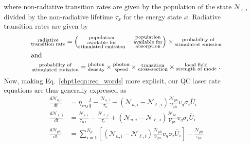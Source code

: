 \documentclass[12pt]{report}
\begin{document}
where non-radiative transition rates are given by the population of the state $\mathcal{N}_{x,i}$ divided by the non-radiative lifetime $\tau_x$ for the energy state $x$.  Radiative transition rates are given by
\begin{gather*}
\begin{subarray}{c}\textnormal{radiative}\\\textnormal{transition rate}\end{subarray} =
\left( \begin{subarray}{c}\textnormal{population}\\\textnormal{available for}\\\textnormal{stimulated emission}\end{subarray} - \begin{subarray}{c}\textnormal{population}\\\textnormal{available for}\\\textnormal{absorption}\end{subarray}\right) \times \begin{subarray}{c}\textnormal{probability of}\\\textnormal{stimulated emission}\end{subarray}\\
\intertext{and}
\begin{subarray}{c}\textnormal{probability of}\\\textnormal{stimulated emission}\end{subarray} = \begin{subarray}{c}\textnormal{photon}\\\textnormal{density}\end{subarray} \times \begin{subarray}{c}\textnormal{photon}\\\textnormal{speed}\end{subarray} \times \begin{subarray}{c}\textnormal{transition}\\\textnormal{cross-section}\end{subarray} \times
\begin{subarray}{c}\textnormal{local field}\\\textnormal{strength of mode}\end{subarray} \textnormal{~.}
\end{gather*}
Now, making Eq.~\eqref{chpt1eqn:req_words} more explicit, our QC laser rate equations are thus generally expressed as
\begin{subequations}
\label{chpt1eqn:req1}
\begin{align}
\frac{d \mathcal{N}_{u,i}}{dt} &= \eta_\textit{inj}\frac{I}{q} - \frac{\mathcal{N}_{u,i}}{\tau_u} - \left( \mathcal{N}_{u,i} - \mathcal{N}_{\ell,i}\right) \frac{\mathcal{N}_{ph}}{\mathcal{V}_{ph}} v_g \sigma_i \bar{U}_i \\
%
\frac{d \mathcal{N}_{\ell,i}}{dt} &= \frac{\mathcal{N}_{u,i}}{\tau_{u\ell}} - \frac{\mathcal{N}_{\ell,i}}{\tau_\ell} + \left( \mathcal{N}_{u,i} - \mathcal{N}_{\ell,i}\right) \frac{\mathcal{N}_{ph}}{\mathcal{V}_{ph}} v_g \sigma_i \bar{U}_i\\
%
\frac{d \mathcal{N}_{ph}}{dt} &= \sum_{i=1}^{N_p}\left[ \left( \mathcal{N}_{u,i} - \mathcal{N}_{\ell,i}\right) \frac{\mathcal{N}_{ph}}{\mathcal{V}_{ph}} v_g \sigma_i \bar{U}_i \right] - \frac{\mathcal{N}_{ph}}{\tau_{ph}}
\end{align}
\end{subequations}
\end{document}
